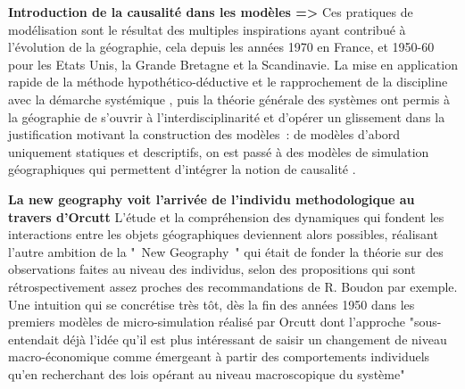 \textbf{Introduction de la causalité dans les modèles => } Ces pratiques de modélisation sont le résultat des multiples inspirations ayant contribué à l’évolution de la géographie, cela depuis les années 1970 en France, et 1950-60 pour les Etats Unis, la Grande Bretagne et la Scandinavie. \autocite{Banos2013} La mise en application rapide de la méthode hypothético-déductive et le rapprochement de la discipline avec la démarche systémique \autocite{Garison1960, Chorley 1962}, puis la théorie générale des systèmes ont permis à la géographie de s'ouvrir à l'interdisciplinarité et d'opérer un glissement dans la justification motivant la construction des modèles : de modèles d’abord uniquement statiques et descriptifs, on est passé à des modèles de simulation géographiques \parencite{Hagerstrand1952, Orcutt1957, Morrill1965, Wilson1970} qui permettent d'intégrer la notion de causalité \parencite[137]{ Pumain2002}.

\textbf{La new geography voit l'arrivée de l'individu methodologique au travers d'Orcutt} L'étude et la compréhension des dynamiques qui fondent les interactions entre les objets géographiques deviennent alors possibles, réalisant l’autre ambition de la " New Geography " qui était de fonder la théorie sur des observations faites au niveau des individus, selon des propositions qui sont rétrospectivement assez proches des recommandations de R. Boudon \autocite{Raymond1984} par exemple. Une intuition qui se concrétise très tôt, dès la fin des années 1950 dans les premiers modèles de micro-simulation  réalisé par Orcutt \autocite{Orcutt1957} dont l'approche "sous-entendait déjà l'idée qu'il est plus intéressant de saisir un changement de niveau macro-économique comme émergeant à partir des comportements individuels qu'en recherchant des lois opérant au niveau macroscopique du système" \autocite{Sanders2007}


